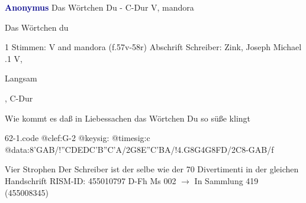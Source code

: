 \documentclass[twocolumn]{book}
\begin{document}
\newline \par \vspace{7pt} \textcolor{darkblue}{\textbf{Anonymus  }}
\newline Das Wörtchen Du - C-Dur
\newline V, mandora
\newline \begin{itshape}[heading, f.57v:] Das Wörtchen du\end{itshape} 
\newline \textcolor{darkblue}{}  1 Stimmen: V and mandora  (f.57v-58r)
\newline Abschrift
\newline Schreiber: Zink, Joseph Michael
.1  V, \begin{itshape}Langsam\end{itshape}, C-Dur
\newline \begin{footnotesize} Wie kommt es daß in Liebessachen das Wörtchen Du so süße klingt \end{footnotesize}  
\begin{filecontents*}{62-1.code}
@clef:G-2
@keysig:
@timesig:c
@data:8'GAB/!{''CD}{ED}{C'B}{''C'A}/2G8E''C'BA/!4.G8G4G8FD/2C8-GAB/f
\end{filecontents*}
\newline
%
\newline Vier Strophen
\newline Der Schreiber ist der selbe wie der 70 Divertimenti in der gleichen Handschrift
\newline RISM-ID: 455010797
\newline D-Fh  Ms 002
\newline $\rightarrow$ In Sammlung 419 (455008345)
      
\end{document}
